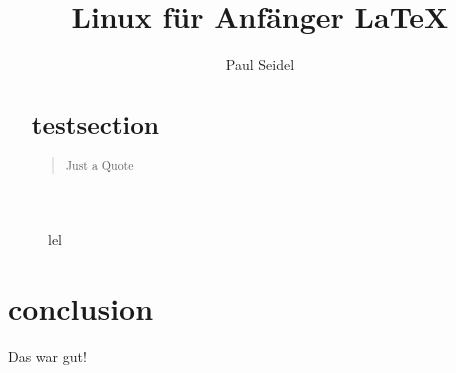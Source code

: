 \documentclass{article}
\begin{document}
    \title{Linux für Anfänger \LaTeX{}}
    \author{Paul Seidel}

    \maketitle

    \begin{abstract}
        \section{testsection}

        \begin{quote}
            Just a Quote
        \end{quote}
    \end{abstract}

    \begin{figure}
        \caption{lel}
    \end{figure}

    \section{conclusion}

    Das war gut!
\end{document}
